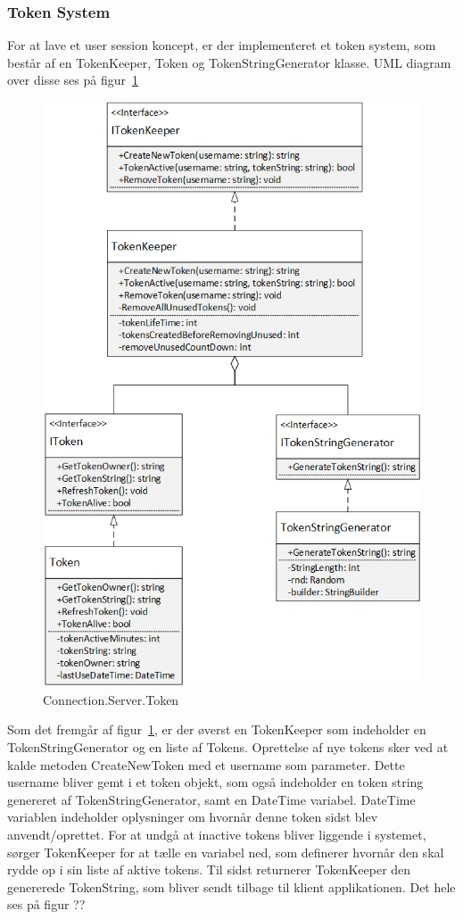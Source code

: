 \subsubsection{Token System}
For at lave et user session koncept, er der implementeret et token system, som består af en TokenKeeper, Token og TokenStringGenerator klasse. UML diagram over disse ses på figur~\ref{fig:ConnectionServerToken}
\begin{figure}
	\centering
	\includegraphics[width=0.7\linewidth]{figs/connection/ConnectionServerToken.png}
	\caption{Connection.Server.Token}
	\label{fig:ConnectionServerToken}
\end{figure}
Som det fremgår af figur~\ref{fig:ConnectionServerToken}, er der øverst en TokenKeeper som indeholder en TokenStringGenerator og en liste af Tokens. Oprettelse af nye tokens sker ved at kalde metoden CreateNewToken med et username som parameter. Dette username bliver gemt i et token objekt, som også indeholder en token string genereret af TokenStringGenerator, samt en DateTime variabel. DateTime variablen indeholder oplysninger om hvornår denne token sidst blev anvendt/oprettet.
For at undgå at inactive tokens bliver liggende i systemet, sørger TokenKeeper for at tælle en variabel ned, som definerer hvornår den skal rydde op i sin liste af aktive tokens. Til sidst returnerer TokenKeeper den genererede TokenString, som bliver sendt tilbage til klient applikationen. Det hele ses på figur ??
